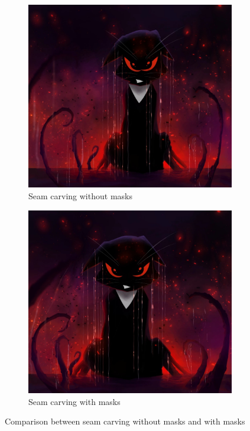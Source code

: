 \documentclass[final]{cvpr}
\begin{document}
\begin{figure}[htb]
\begin{center}
\begin{subfigure}[b]{0.48\linewidth}
    \includegraphics[width=\textwidth]{gibbous_seam_carving_without_mask.jpg}
    \caption{Seam carving without masks}
\end{subfigure}
\begin{subfigure}[b]{0.48\linewidth}
    \includegraphics[width=\textwidth]{gibbous_seam_carving.jpg}
    \caption{Seam carving with masks}
\end{subfigure}
\end{center}
\caption{Comparison between seam carving without masks and with masks}
\label{fig:gibbous_seam_carving_mask}
\end{figure}
\end{document}
